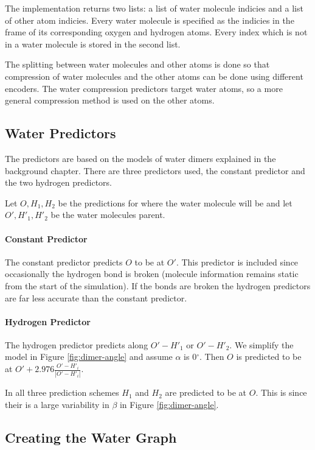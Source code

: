 \documentclass{report}
\newcommand{\degree}{\ensuremath{^\circ}}
\begin{document}
The implementation returns two lists: a list of water molecule indicies and a
list of other atom indicies. Every water molecule is specified as the indicies
in the frame of its corresponding oxygen and hydrogen atoms. Every index which
is not in a water molecule is stored in the second list.

The splitting between water molecules and other atoms is done so that
compression of water molecules and the other atoms can be done using different
encoders. The water compression predictors target water atoms, so a more
general compression method is used on the other atoms.


\subsection{Water Predictors}

The predictors are based on the models of water dimers explained in the
background chapter. There are three predictors used, the constant predictor
and the two hydrogen predictors.

Let $O, H_1, H_2$ be the predictions for where the water molecule will be and
let $O', H'_1, H'_2$ be the water molecules parent.

\paragraph{Constant Predictor}
The constant predictor predicts $O$ to be at $O'$. This predictor is included
since occasionally the hydrogen bond is broken (molecule information remains
static from the start of the simulation). If the bonds are broken the hydrogen
predictors are far less accurate than the constant predictor.

\paragraph{Hydrogen Predictor}
The hydrogen predictor predicts along $O'-H'_1$ or $O'-H'_2$. We simplify the
model in Figure \ref{fig:dimer-angle} and assume $\alpha$ is $0\degree$. Then
$O$ is predicted to be at $O' + 2.976\frac{O'-H'_i}{|O'-H'_i|}$.

In all three prediction schemes $H_1$ and $H_2$ are predicted to be at
$O$. This is since their is a large variability in $\beta$ in Figure
\ref{fig:dimer-angle}.


\subsection{Creating the Water Graph}
\end{document}
